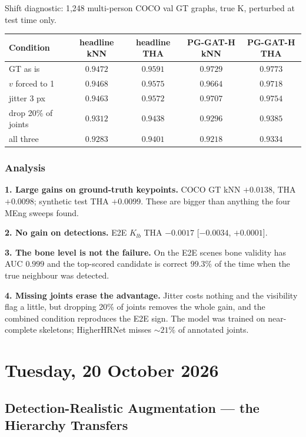 \vspace{0.5em}

Shift diagnostic: 1,248 multi-person COCO val GT graphs, true K, perturbed at test time only.

\begin{tabular}{lcccc}
\hline
\textbf{Condition} & \textbf{headline kNN} & \textbf{headline THA} & \textbf{PG-GAT-H kNN} & \textbf{PG-GAT-H THA} \\
\hline
GT as is               & $0.9472$ & $0.9591$ & $\mathbf{0.9729}$ & $\mathbf{0.9773}$ \\
$v$ forced to 1        & $0.9468$ & $0.9575$ & $0.9664$ & $0.9718$ \\
jitter 3 px            & $0.9463$ & $0.9572$ & $0.9707$ & $0.9754$ \\
drop 20\% of joints    & $0.9312$ & $0.9438$ & $0.9296$ & $0.9385$ \\
all three              & $0.9283$ & $0.9401$ & $0.9218$ & $0.9334$ \\
\hline
\end{tabular}

\subsubsection{Analysis}

\textbf{1. Large gains on ground-truth keypoints.} COCO GT kNN $+0.0138$, THA $+0.0098$; synthetic test THA $+0.0099$. These are bigger than anything the four MEng sweeps found.

\textbf{2. No gain on detections.} E2E $K_{lb}$ THA $-0.0017$ [$-0.0034$, $+0.0001$].

\textbf{3. The bone level is not the failure.} On the E2E scenes bone validity has AUC $0.999$ and the top-scored candidate is correct $99.3\%$ of the time when the true neighbour was detected.

\textbf{4. Missing joints erase the advantage.} Jitter costs nothing and the visibility flag a little, but dropping 20\% of joints removes the whole gain, and the combined condition reproduces the E2E sign. The model was trained on near-complete skeletons; HigherHRNet misses $\sim\!21\%$ of annotated joints.

\section[2026/10/20]{Tuesday, 20 October 2026}

\subsection{Detection-Realistic Augmentation --- the Hierarchy Transfers}

